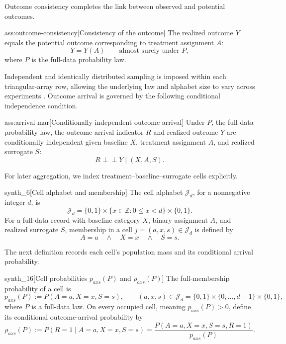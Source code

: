 \documentclass[11pt]{article}
\begin{document}
Outcome consistency completes the link between observed and potential outcomes.

\begin{assumptionv}{ass:outcome-consistency}[Consistency of the outcome]
The realized outcome \(Y\) equals the potential outcome corresponding to treatment assignment \(A\):
\[
Y=Y(A)\qquad\text{almost surely under }P,
\]
where \(P\) is the full-data probability law.
\end{assumptionv}

Independent and identically distributed sampling is imposed within each triangular-array row, allowing the underlying law and alphabet size to vary across experiments \citep{ZengBalakrishnanHanKennedy2026}. Outcome arrival is governed by the following conditional independence condition.

\begin{assumptionv}{ass:arrival-mar}[Conditionally independent outcome arrival]
Under \(P\), the full-data probability law, the outcome-arrival indicator \(R\) and realized outcome \(Y\) are conditionally independent given baseline \(X\), treatment assignment \(A\), and realized surrogate \(S\):
\[
R\perp\!\!\!\perp Y\mid(X,A,S).
\]
\end{assumptionv}

For later aggregation, we index treatment--baseline--surrogate cells explicitly.

\begin{definitionv}{synth_6}[Cell alphabet and membership]
The cell alphabet \(\mathcal J_d\), for a nonnegative integer \(d\), is
\[
\mathcal J_d
=
\{0,1\}\times\{x\in\mathbb Z:0\le x<d\}\times\{0,1\}.
\]
For a full-data record with baseline category \(X\), binary assignment \(A\), and realized surrogate \(S\), membership in a cell \(j=(a,x,s)\in\mathcal J_d\) is defined by
\[
A=a \quad\land\quad X=x \quad\land\quad S=s.
\]
\end{definitionv}

The next definition records each cell's population mass and its conditional arrival probability.

\begin{definitionv}{synth_16}[Cell probabilities \(p_{axs}(P)\) and \(\rho_{axs}(P)\)]
The full-membership probability of a cell is
\[
p_{axs}(P):=P(A=a,X=x,S=s),
\qquad
(a,x,s)\in\mathcal J_d
=\{0,1\}\times\{0,\ldots,d-1\}\times\{0,1\},
\]
where \(P\) is a full-data law. On every occupied cell, meaning \(p_{axs}(P)>0\), define its conditional outcome-arrival probability by
\[
\rho_{axs}(P)
:=
P(R=1\mid A=a,X=x,S=s)
=
\frac{P(A=a,X=x,S=s,R=1)}{p_{axs}(P)}.
\]
\end{definitionv}
\end{document}
